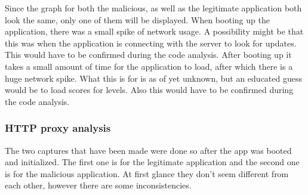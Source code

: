 Since the graph for both the malicious, as well as the legitimate application both look the same, only one of them will be displayed. When booting up the application, there was a small spike of network usage. A possibility might be that this was when the application is connecting with the server to look for updates. This would have to be confirmed during the code analysis.
After booting up it takes a small amount of time for the application to load, after which there is a huge network spike. What this is for is as of yet unknown, but an educated guess would be to load scores for levels. Also this would have to be confirmed during the code analysis.
\subsubsection{HTTP proxy analysis}
The two captures that have been made were done so after the app was booted and initialized. The first one is for the legitimate application and the second one is for the malicious application. At first glance they don’t seem different from each other, however there are some inconsistencies.

